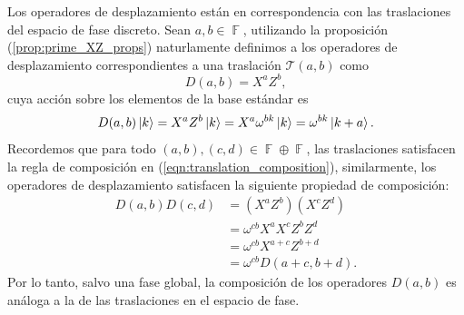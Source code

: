 \documentclass[a4paper]{report}
\DeclareMathOperator{\F}{\mathbb{F}}
\begin{document}
  Los operadores de desplazamiento están en correspondencia
  con las traslaciones del espacio de fase discreto. Sean
  $a,b \in \F$, utilizando la proposición
  (\ref{prop:prime_XZ_props}) naturlamente definimos a los
  operadores de desplazamiento correspondientes a una
  traslación $\mathcal T(a,b)$ como 
  \begin{equation}
    D(a,b)
    = X^{a} Z^{b},
  \end{equation}
  cuya acción sobre los elementos de la base estándar es
  \[
    D(a,b) \ket{k}
    = X^{a} Z^{b} \ket k
    = X^{a} \omega^{bk} \ket k
    = \omega^{bk} \ket{k+a}.
  \] 
  Recordemos que para todo $(a,b), (c,d) \in \F \oplus \F$,
  las traslaciones satisfacen la regla de composición en
  (\ref{eqn:translation_composition}), similarmente, los
  operadores de desplazamiento satisfacen la siguiente
  propiedad de composición:
  \begin{align}
    D(a,b) D(c,d)
    &= \left( X^{a}Z^{b} \right) \left( X^{c}Z^{d} \right)
    \\
    &= \omega^{c b} X^{a} X^{c} Z^{b} Z^{d} \\
    &= \omega^{c b} X^{a+c} Z^{b+d} \\
    &= \omega^{c b} D(a+c, b+d).
  \end{align}
  Por lo tanto, salvo una fase global, la composición de los
  operadores $D(a,b)$ es análoga a la de las traslaciones en
  el espacio de fase.
\end{document}

